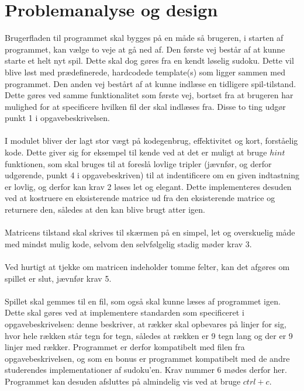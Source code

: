 \documentclass[a4paper]{article}
\begin{document}
	
	\section{Problemanalyse og design}
	Brugerfladen til programmet skal bygges på en måde så brugeren, i starten af programmet, kan vælge to veje at gå ned af. Den første vej består af at kunne starte et helt nyt spil. Dette skal dog gøres fra en kendt løselig sudoku. Dette vil blive løst med prædefinerede, hardcodede template(s) som ligger sammen med programmet. Den anden vej bestårt af at kunne indlæse en tidligere spil-tilstand. Dette gøres ved samme funktionalitet som første vej, bortset fra at brugeren har mulighed for at specificere hvilken fil der skal indlæses fra. Disse to ting udgør punkt 1 i opgavebeskrivelsen.
	\\\\
	I modulet bliver der lagt stor vægt på kodegenbrug, effektivitet og kort, forståelig kode. Dette giver sig for eksempel til kende ved at det er muligt at bruge $hint$ funktionen, som skal bruges til at foreslå lovlige tripler (jævnfør, og derfor udgørende, punkt 4 i opgavebeskriven) til at indentificere om en given indtastning er lovlig, og derfor kan krav 2 løses let og elegant. Dette implementeres desuden ved at kostruere en eksisterende matrice ud fra den eksisterende matrice og returnere den, således at den kan blive brugt atter igen.
	\\\\
	Matricens tilstand skal skrives til skærmen på en simpel, let og overskuelig måde med mindst mulig kode, selvom den selvfølgelig stadig møder krav 3.
	\\\\
	Ved hurtigt at tjekke om matricen indeholder tomme felter, kan det afgøres om spillet er slut, jævnfør krav 5. 
	\\\\
	Spillet skal gemmes til en fil, som også skal kunne læses af programmet igen. Dette skal gøres ved at implementere standarden som specificeret i opgavebeskrivelsen: denne beskriver, at rækker skal opbevares på linjer for sig, hvor hele rækken står tegn for tegn, således at rækken er 9 tegn lang og der er 9 linjer med rækker. Programmet er derfor kompatibelt med filen fra opgavebeskrivelsen, og som en bonus er programmet kompatibelt med de andre studerendes implementationer af sudoku'en. Krav nummer 6 mødes derfor her. Programmet kan desuden afsluttes på almindelig vis ved at bruge $ctrl + c$. 
\end{document}
